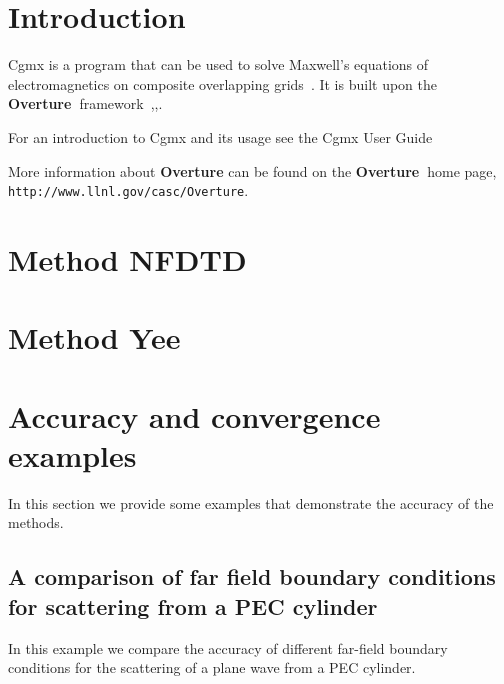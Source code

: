\documentclass{article}
\newcommand{\Overture}{{\bf Overture\ }}
\begin{document}
\section{Introduction}

   Cgmx is a program that can be used to solve Maxwell's equations of electromagnetics 
on composite overlapping grids~\cite{max2006b}. It is built upon
the \Overture framework~\cite{Brown97},\cite{Henshaw96a},\cite{iscope97}.

For an introduction to Cgmx and its usage see the Cgmx User Guide~\cite{CgmxUserGuide}

More information about
{\bf Overture} can be found on the \Overture home page, {\tt http://www.llnl.gov/\-casc/\-Overture}.

\clearpage
\section{Method NFDTD} \label{sec:nfdtd}


\clearpage
\section{Method Yee} \label{sec:nfdtd}



\clearpage
\section{Accuracy and convergence examples} \label{sec:examples}

In this section we provide some examples that demonstrate the accuracy of the methods.

\clearpage
\subsection{A comparison of far field boundary conditions for scattering from a PEC cylinder}

In this example we compare the accuracy of different far-field boundary conditions for
the scattering of a plane wave from a PEC cylinder.
\end{document}
